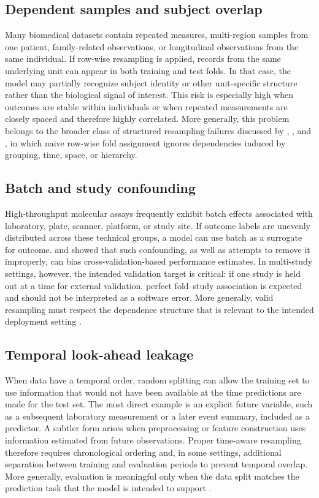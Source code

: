 \documentclass[article,shortnames]{jss}
\begin{document}
\subsection{Dependent samples and subject overlap}

Many biomedical datasets contain repeated measures, multi-region samples from one patient, family-related observations, or longitudinal observations from the same individual. If row-wise resampling is applied, records from the same underlying unit can appear in both training and test folds. In that case, the model may partially recognize subject identity or other unit-specific structure rather than the biological signal of interest. This risk is especially high when outcomes are stable within individuals or when repeated measurements are closely spaced and therefore highly correlated. More generally, this problem belongs to the broader class of structured resampling failures discussed by \citet{roberts2017}, \citet{wenger2012}, and \citet{valavi2019}, in which naive row-wise fold assignment ignores dependencies induced by grouping, time, space, or hierarchy.

\subsection{Batch and study confounding}

High-throughput molecular assays frequently exhibit batch effects associated with laboratory, plate, scanner, platform, or study site. If outcome labels are unevenly distributed across these technical groups, a model can use batch as a surrogate for outcome. \citet{soneson2014} and \citet{hamdan2023} showed that such confounding, as well as attempts to remove it improperly, can bias cross-validation-based performance estimates. In multi-study settings, however, the intended validation target is critical: if one study is held out at a time for external validation, perfect fold--study association is expected and should not be interpreted as a software error. More generally, valid resampling must respect the dependence structure that is relevant to the intended deployment setting \citep{roberts2017}.

\subsection{Temporal look-ahead leakage}

When data have a temporal order, random splitting can allow the training set to use information that would not have been available at the time predictions are made for the test set. The most direct example is an explicit future variable, such as a subsequent laboratory measurement or a later event summary, included as a predictor. A subtler form arises when preprocessing or feature construction uses information estimated from future observations. Proper time-aware resampling therefore requires chronological ordering and, in some settings, additional separation between training and evaluation periods to prevent temporal overlap. More generally, evaluation is meaningful only when the data split matches the prediction task that the model is intended to support \citep{stone1974, arlot2010, hastie2009}.
\end{document}

